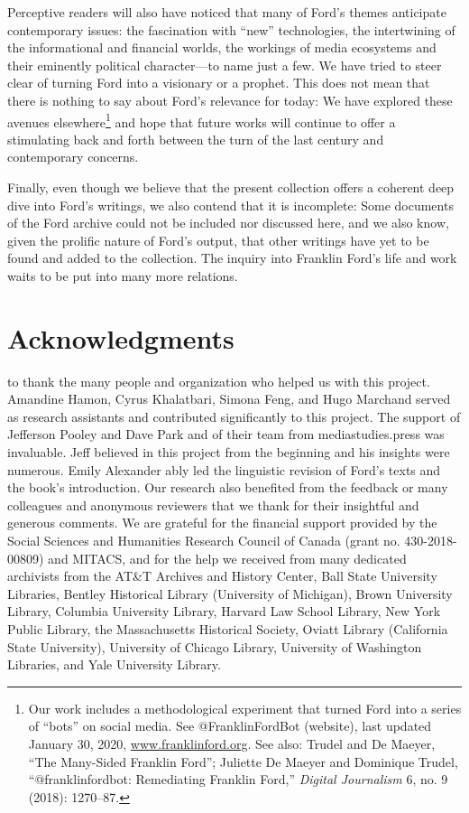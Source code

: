 \documentclass[openany,nobib]{tufte-book}
\let\oldchapter\chapter
\def\chapter{%
  \setcounter{footnote}{0}%
  \oldchapter
}
\begin{document}
Perceptive readers will also have noticed that many of Ford's themes
anticipate contemporary issues: the fascination with ``new''
technologies, the intertwining of the informational and financial
worlds, the workings of media ecosystems and their eminently political
character---to name just a few. We have tried to steer clear of turning
Ford into a visionary or a prophet. This does not mean that there is
nothing to say about Ford's relevance for today: We have explored these
avenues elsewhere\footnote{Our work includes a methodological experiment
  that turned Ford into a series of ``bots'' on social media. See
  @FranklinFordBot (website), last updated January 30, 2020,
  \href{http://www.franklinford.org}{www.franklinford.org}. See
  also: Trudel and De Maeyer, ``The Many-Sided Franklin Ford''; Juliette
  De Maeyer and Dominique Trudel, ``@franklinfordbot: Remediating
  Franklin Ford,'' \emph{Digital Journalism} 6, no. 9 (2018): 1270--87.}
and hope that future works will continue to offer a stimulating back and
forth between the turn of the last century and contemporary concerns.

Finally, even though we believe that the present collection offers a
coherent deep dive into Ford's writings, we also contend that it is
incomplete: Some documents of the Ford archive could not be included nor
discussed here, and we also know, given the prolific nature of Ford's
output, that other writings have yet to be found and added to the
collection. The inquiry into Franklin Ford's life and work waits to be
put into many more relations.

\chapter[Acknowledgments]{Acknowledgments}
\label{ch:Acknowledgments}

 to thank the many people and organization who helped us
with this project. Amandine Hamon, Cyrus Khalatbari, Simona Feng, and
Hugo Marchand served as research assistants and contributed
significantly to this project. The support of Jefferson Pooley and Dave
Park and of their team from mediastudies.press was invaluable. Jeff
believed in this project from the beginning and his insights were
numerous. Emily Alexander ably led the linguistic revision of Ford's
texts and the book's introduction. Our research also benefited from the
feedback or many colleagues and anonymous reviewers that we thank for
their insightful and generous comments. We are grateful for the
financial support provided by the Social Sciences and Humanities
Research Council of Canada (grant no. 430-2018-00809) and MITACS, and
for the help we received from many dedicated archivists from the
AT\&T Archives and History Center, Ball State University Libraries,
Bentley Historical Library (University of Michigan), Brown University
Library, Columbia University Library, Harvard Law School Library, New
York Public Library, the Massachusetts Historical Society, Oviatt
Library (California State University), University of Chicago Library,
University of Washington Libraries, and Yale University Library.
\end{document}
